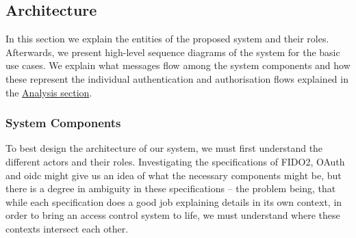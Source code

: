 \subsection{Architecture}

In this section we explain the entities of the proposed system and their roles. Afterwards, we present high-level sequence diagrams of the system for the basic use cases. We explain what messages flow among the system components and how these represent the individual authentication and authorisation flows explained in the \href{sec:analysis}{Analysis section}.

\subsubsection{System Components}
To best design the architecture of our system, we must first understand the different actors and their roles. Investigating the specifications of FIDO2, OAuth and \acrshort{oidc} might give us an idea of what the necessary components might be, but there is a degree in ambiguity in these specifications -- the problem being, that while each specification does a good job explaining details in its own context, in order to bring an access control system to life, we must understand where these contexts intersect each other.

